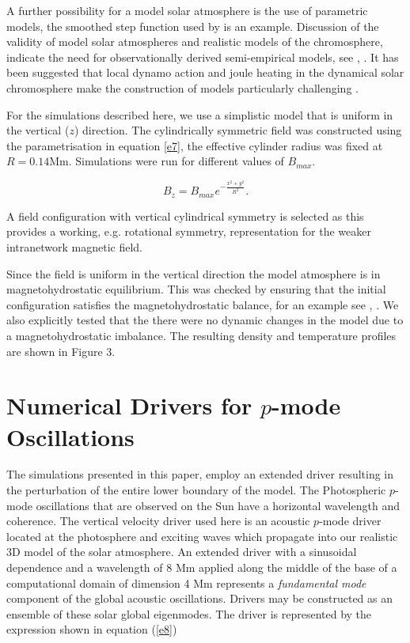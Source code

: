 \documentclass[physics,article,submit,pdftex,moreauthors]{Definitions/mdpi}
\begin{document}
A further possibility for a model solar atmosphere is the use of parametric models, the smoothed step function used by \cite{Murawski2010} is an example. Discussion of the validity of model solar atmospheres and realistic models of the chromosphere,  indicate the need for observationally derived semi-empirical models, see \cite{Carlsson1995}, \cite{Kalkofen2012}. It has been suggested that local dynamo action and joule heating in the dynamical solar chromosphere make the construction of models particularly challenging \cite{Leenaarts2011}.


For the simulations described here, we use a simplistic model  that is uniform in the vertical ($z$) direction. The cylindrically symmetric field was constructed using  the parametrisation in equation \ref{e7}, the effective cylinder radius was fixed at $R=0.14$Mm. Simulations were run for different values of $B_{max}$.

\begin{equation}
B_{z}=B_{max} e^{-\frac{x^2+y^2}{R^2}}. \label{e7}
\end{equation}

A field configuration with vertical cylindrical symmetry is selected as this provides a working, e.g. rotational symmetry, representation for  the weaker intranetwork magnetic field.

Since the field is uniform in the vertical direction the model atmosphere is in magnetohydrostatic equilibrium. This was checked by ensuring that the initial configuration satisfies the magnetohydrostatic balance, for an example see \cite{Schussler2005}, \cite{Gent2013}. We also explicitly tested that the there were no dynamic changes in the model due to a magnetohydrostatic imbalance. The resulting density and temperature profiles are shown in Figure 3. 


\section{Numerical Drivers for $p$-mode Oscillations}



The simulations presented in this paper, employ an extended driver resulting in the perturbation of the entire lower boundary of the model.  The Photospheric $p$-mode oscillations  that are observed on the Sun have a horizontal wavelength and coherence. The vertical velocity driver used here is an acoustic $p$-mode driver located at the photosphere and exciting waves which propagate into our realistic 3D model of the solar atmosphere. An extended driver with a sinusoidal dependence and a wavelength of 8 Mm applied along the middle of the base of a computational domain of dimension 4 Mm represents  a {\it fundamental mode}  component of the global acoustic oscillations. Drivers may be constructed as an ensemble of these solar global eigenmodes. The driver is represented by the expression shown in equation (\ref{e8}) 
\end{document}
